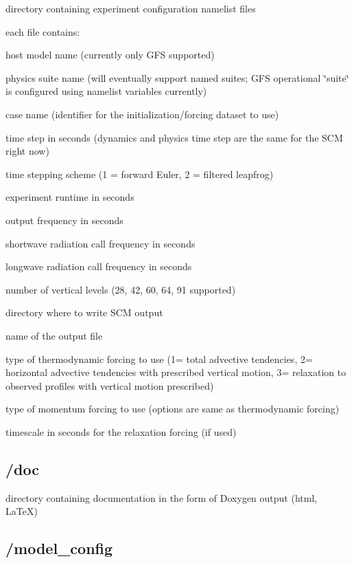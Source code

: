 \begin{DoxyItemize}
\item directory containing experiment configuration namelist files
\item each file contains\+:
\begin{DoxyItemize}
\item host model name (currently only G\+FS supported)
\item physics suite name (will eventually support named suites; G\+FS operational \char`\"{}suite\char`\"{} is configured using namelist variables currently)
\item case name (identifier for the initialization/forcing dataset to use)
\item time step in seconds (dynamics and physics time step are the same for the S\+CM right now)
\item time stepping scheme (1 = forward Euler, 2 = filtered leapfrog)
\item experiment runtime in seconds
\item output frequency in seconds
\item shortwave radiation call frequency in seconds
\item longwave radiation call frequency in seconds
\item number of vertical levels (28, 42, 60, 64, 91 supported)
\item directory where to write S\+CM output
\item name of the output file
\item type of thermodynamic forcing to use (1= total advective tendencies, 2= horizontal advective tendencies with prescribed vertical motion, 3= relaxation to observed profiles with vertical motion prescribed)
\item type of momentum forcing to use (options are same as thermodynamic forcing)
\item timescale in seconds for the relaxation forcing (if used) 
\end{DoxyItemize}
\end{DoxyItemize}\hypertarget{index_doc}{}\subsection{/doc}\label{index_doc}

\begin{DoxyItemize}
\item directory containing documentation in the form of Doxygen output (html, La\+TeX) 
\end{DoxyItemize}\hypertarget{index_model_config}{}\subsection{/model\+\_\+config}\label{index_model_config}

